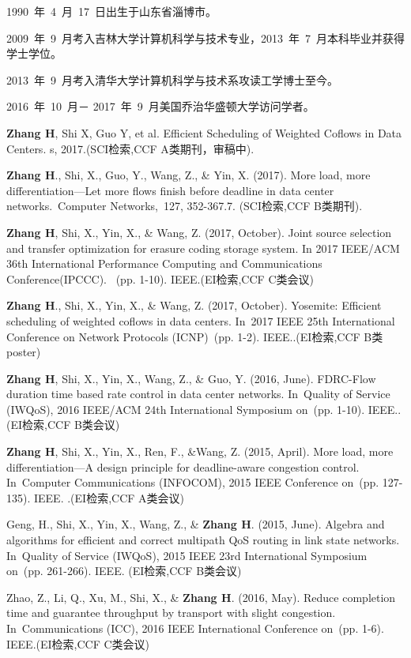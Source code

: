 \begin{resume}


  1990~年~4~月~17~日出生于山东省淄博市。

  2009~年~9~月考入吉林大学计算机科学与技术专业，2013~年~7~月本科毕业并获得学士学位。

  2013~年~9~月考入清华大学计算机科学与技术系攻读工学博士至今。
  
  
  2016~年~10~月－  2017~年~9~月美国乔治华盛顿大学访问学者。

  
\begin{enumerate}[{[}1{]}]
\item \textbf{Zhang H}, Shi X, Guo Y, et al. Efficient Scheduling of Weighted Coflows in Data Centers. s, 2017.(SCI检索,CCF A类期刊，审稿中).
\item \textbf{Zhang H}., Shi, X., Guo, Y., Wang, Z., \& Yin, X. (2017). More load, more differentiation—Let more flows finish before deadline in data center networks. Computer Networks, 127, 352-367.7. (SCI检索,CCF B类期刊).
\item \textbf{Zhang H}, Shi, X., Yin, X.,  \& Wang, Z. (2017, October). Joint source selection and transfer optimization for erasure coding storage system. In 2017 IEEE/ACM 36th International Performance Computing and Communications Conference(IPCCC).  (pp. 1-10). IEEE.(EI检索,CCF C类会议)
\item \textbf{Zhang H}., Shi, X., Yin, X.,  \& Wang, Z. (2017, October). Yosemite: Efficient scheduling of weighted coflows in data centers. In 2017 IEEE 25th International Conference on Network Protocols (ICNP) (pp. 1-2). IEEE..(EI检索,CCF B类 poster)
\item \textbf{Zhang H}, Shi, X., Yin, X., Wang, Z.,  \& Guo, Y. (2016, June). FDRC-Flow duration time based rate control in data center networks. In Quality of Service (IWQoS), 2016 IEEE/ACM 24th International Symposium on (pp. 1-10). IEEE..(EI检索,CCF B类会议)
\item \textbf{Zhang H}, Shi, X., Yin, X., Ren, F., \&Wang, Z. (2015, April). More load, more differentiation—A design principle for deadline-aware congestion control. In Computer Communications (INFOCOM), 2015 IEEE Conference on (pp. 127-135). IEEE. .(EI检索,CCF A类会议)
 \item  Geng, H., Shi, X., Yin, X., Wang, Z., \&  \textbf{Zhang H}. (2015, June). Algebra and algorithms for efficient and correct multipath QoS routing in link state networks. In Quality of Service (IWQoS), 2015 IEEE 23rd International Symposium on (pp. 261-266). IEEE.  (EI检索,CCF B类会议)
\item Zhao, Z., Li, Q., Xu, M., Shi, X.,  \&  \textbf{Zhang H}. (2016, May). Reduce completion time and guarantee throughput by transport with slight congestion. In Communications (ICC), 2016 IEEE International Conference on (pp. 1-6). IEEE.(EI检索,CCF C类会议)
\end{enumerate}



\end{resume}
